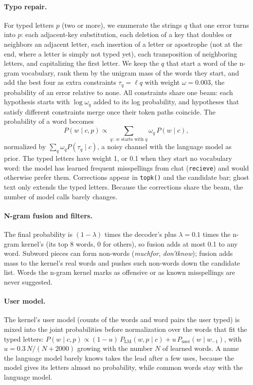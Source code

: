 \documentclass[11pt]{article}
\begin{document}
\paragraph{Typo repair.} For typed letters $p$ (two or more), we enumerate the strings $q$ that one error turns into
$p$: each adjacent-key substitution, each deletion of a key that doubles or neighbors an adjacent letter, each
insertion of a letter or apostrophe (not at the end, where a letter is simply not typed yet), each transposition of
neighboring letters, and capitalizing the first letter. We keep the $q$ that start a word of the n-gram
vocabulary, rank them by the unigram mass of the words they start, and add the best four as extra constraints
$\tau_q = \ell q$ with weight $\omega = 0.003$, the probability of an error relative to none. All constraints share
one beam: each hypothesis starts with $\log \omega_q$ added to its log probability, and hypotheses that satisfy
different constraints merge once their token paths coincide. The probability of a word becomes
\begin{equation}
P(w \mid c, p) \propto \sum_{q \,:\, w \text{ starts with } q} \omega_q\, P(w \mid c),
\end{equation}
normalized by $\sum_q \omega_q P(\tau_q \mid c)$, a noisy channel \citep{kernighan-etal-1990-spelling} with the
language model as prior. The typed letters have weight 1, or 0.1 when they start no vocabulary word: the model has
learned frequent misspellings from chat (\texttt{recieve}) and would otherwise prefer them. Corrections appear in
\texttt{topk()} and the candidate bar; ghost text only extends the typed letters. Because the corrections share the
beam, the number of model calls barely changes.

\paragraph{N-gram fusion and filters.} The final probability is $(1-\lambda)$ times the decoder's plus $\lambda =
0.1$ times the n-gram kernel's (its top 8 words, 0 for others), so fusion adds at most 0.1 to any word. Subword pieces
can form non-words (\textit{muchfor}, \textit{don'tknow}); fusion adds mass to the kernel's real words and pushes such
non-words down the candidate list. Words the n-gram kernel marks as offensive or as known misspellings are never
suggested.

\paragraph{User model.} The kernel's user model (counts of the words and word pairs the user typed) is mixed into
the joint probabilities before normalization over the words that fit the typed letters:
$P(w \mid c, p) \propto (1-u)\,P_{\mathrm{LM}}(w, p \mid c) + u\,P_{\mathrm{user}}(w \mid w_{-1})$, with
$u = 0.3\,N/(N + 2000)$ growing with the number $N$ of learned words. A name the language model barely knows takes
the lead after a few uses, because the model gives its letters almost no probability, while common words stay with
the language model.
\end{document}
